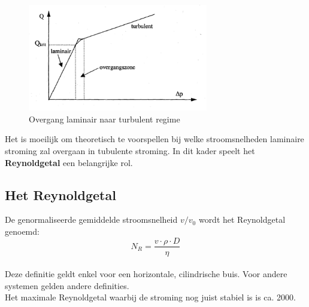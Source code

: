 \begin{figure}[h]
    \centering
    \caption{Overgang laminair naar turbulent regime}
    \label{fig:overgang_lam_turb}
    \includegraphics[width=0.7\textwidth]{img/figuur_3_theorie.png}
\end{figure}

Het is moeilijk om theoretisch te voorspellen bij welke stroomsnelheden laminaire
stroming zal overgaan in tubulente stroming. In dit kader speelt het 
\textbf{Reynoldgetal} een belangrijke rol.
\\

\subsection{Het Reynoldgetal}
De genormaliseerde gemiddelde stroomsnelheid $v/v_{0}$ wordt het Reynoldgetal genoemd:
\\

$$N_{R} = \frac{v \cdot \rho \cdot D}{\eta}$$
\\

Deze definitie geldt enkel voor een horizontale, cilindrische buis.
Voor andere systemen gelden andere definities.
\\

Het maximale Reynoldgetal waarbij de stroming nog juist stabiel is is ca. 2000.